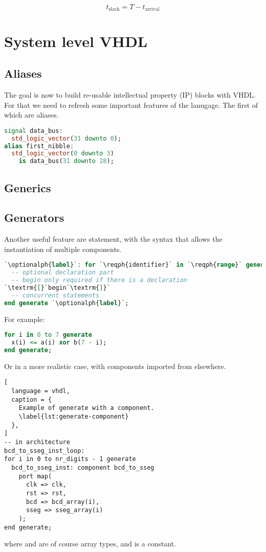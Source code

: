 \documentclass[margin=small]{tex/hsrzf}
\begin{document}
\[
  t_\text{slack} = T - t_\text{arrival}
\]

\section{System level VHDL}

\subsection{Aliases}
The goal is now to build re-usable intellectual property (IP) blocks with VHDL. For that we need to refresh some important features of the lanugage. The first of which are aliases.
\begin{lstlisting}[language=vhdl]
signal data_bus:
  std_logic_vector(31 downto 0);
alias first_nibble:
  std_logic_vector(0 downto 3)
    is data_bus(31 downto 28);
\end{lstlisting}

\subsection{Generics}

\subsection{Generators}
Another useful feature are  statement, with the syntax that allows the instantiation of multiple components.
\begin{lstlisting}[language=vhdl]
`\optionalph{label}`: for `\reqph{identifier}` in `\reqph{range}` generate
  -- optional declaration part
  -- begin only required if there is a declaration
`\textrm{[}`begin`\textrm{]}`
  -- concurrent statements
end generate `\optionalph{label}`;
\end{lstlisting}
For example:
\begin{lstlisting}[language=vhdl]
for i in 0 to 7 generate
  x(i) <= a(i) xor b(7 - i);
end generate;
\end{lstlisting}
Or in a more realistic case, with components imported from elsewhere.
\begin{lstlisting}[
  language = vhdl,
  caption = {
    Example of generate with a component.
    \label{lst:generate-component}
  },
]
-- in architecture
bcd_to_sseg_inst_loop:
for i in 0 to nr_digits - 1 generate
  bcd_to_sseg_inst: component bcd_to_sseg
    port map(
      clk => clk,
      rst => rst,
      bcd => bcd_array(i),
      sseg => sseg_array(i)
    );
end generate;
\end{lstlisting}
where  and  are of course array types, and  is a constant.
\end{document}
